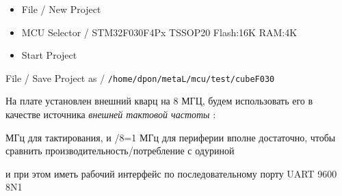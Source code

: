 \label{f030}\secdown

\begin{itemize}
  \item File / New Project
  \item MCU Selector / STM32F030F4Px TSSOP20 Flash:16K RAM:4K
  \item Start Project
\end{itemize}

File / Save Project as / \verb|/home/dpon/metaL/mcu/test/cubeF030|





На плате установлен внешний кварц на 8 МГЦ, будем использовать его в качестве
источника \emph{внешней тактовой частоты} :

\medskip
{}

 МГц для тактирования, и /8=1 МГц для периферии вполне достаточно, чтобы
сравнить производительность/потребление с одуриной

\bigskip
{}

\clearpage\noindent
и при этом иметь рабочий интерфейс по последовательному порту UART 9600 8N1

\bigskip
{}

\secup

